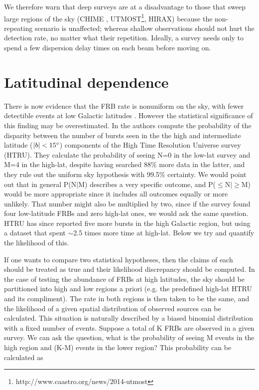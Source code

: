 \documentclass[useAMS,usenatbib]{mn2e}
\begin{document}
We therefore warn that deep surveys are at a disadvantage 
to those that sweep large regions of the sky 
(CHIME  \citep{2014SPIE.9145E..22B}, 
UTMOST\footnote{http://www.caastro.org/news/2014-utmost}, HIRAX)
because the non-repeating 
scenario is unaffected; whereas shallow observations 
should not hurt the detection rate, no matter what their repetition. 
Ideally, a survey
needs only to spend a few dispersion delay times on each beam 
before moving on. 

\section{Latitudinal dependence}
\label{latitude}
There is now evidence that the FRB rate is nonuniform on the sky, 
with fewer detectible events at low Galactic latitudes \citep{2014ira..book.....B}.
However the statistical significance of this finding may be 
overestimated. In \cite{2014ApJ...789L..26P}
the authors compute the probability of the disparity between the number of 
bursts seen in the the high and intermediate latitude ($|b| < 15\degree$)
 components of the High Time Resolution Universe survey 
(HTRU). They calculate the probability of seeing N=0 in the low-lat survey and M=4 in 
the high-lat, despite having searched 88$\%$ more data in the latter, and they 
rule out the uniform sky hypothesis with 99.5$\%$ certainty. We would point out 
that in general P(N$|$M) describes a very specific outcome, and P($\le$N$|\ge$M) would be 
more appropriate since it includes all outcomes equally or more unlikely.
That number might also be multiplied by two, since if the survey found 
four low-latitude FRBs and zero high-lat ones, we would ask the same question. HTRU 
has since reported five more bursts in the high Galactic region, but using a dataset 
that spent $\sim$2.5 times more time at high-lat. Below we try and quantify the likelihood of 
this.


If one wants to 
compare two statistical hypotheses, then the claims of each should 
be treated as true and their likelihood discrepancy should be computed.
In the case of testing the abundance of FRBs at high latitudes,
the sky should be partitioned into high and low regions a priori 
(e.g. the predefined high-lat HTRU and its compliment). The rate in both regions 
is then taken to be the same, and the likelihood of a given spatial distribution of observed
sources can be calculated. This situation is naturally
described by a biased binomial distribution with a fixed number of events. Suppose
a total of K FRBs are observed in a given survey. We can ask the question, what is the probability of 
seeing M events in the high region and (K-M) events in the lower region? 
This probability can be calculated %
as 
\end{document}
